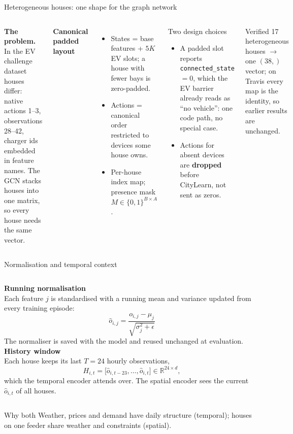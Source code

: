 \documentclass[aspectratio=169,10pt]{beamer}
\newcommand{\R}{\mathbb{R}}
\begin{document}
\begin{frame}{Heterogeneous houses: one shape for the graph network}
\begin{columns}[T]
\textbf{The problem.} In the EV challenge dataset houses differ: native actions 1--3, observations 28--42, charger ids embedded in feature names. The GCN stacks houses into one matrix, so every house needs the same vector.

\vspace{0.4em}
\textbf{Canonical padded layout}
\begin{itemize}
  \item States = base features + $5K$ EV slots; a house with fewer bays is zero-padded.
  \item Actions = canonical order restricted to devices some house owns.
  \item Per-house index map; presence mask $M \in \{0,1\}^{B\times A}$.
\end{itemize}
\begin{block}{Two design choices}
\begin{itemize}
  \item A padded slot reports \texttt{connected\_state} $=0$, which the EV barrier already reads as ``no vehicle'': one code path, no special case.
  \item Actions for absent devices are \textbf{dropped} before CityLearn, not sent as zeros.
\end{itemize}
\end{block}
\begin{exampleblock}{Verified}
17 heterogeneous houses $\rightarrow$ one $(38,)$ vector; on Travis every map is the identity, so earlier results are unchanged.
\end{exampleblock}
\end{columns}
\end{frame}

\begin{frame}{Normalisation and temporal context}
\begin{columns}[T]
\textbf{Running normalisation}\\[2pt]
Each feature $j$ is standardised with a running mean and variance updated from every training episode:
\[
\hat o_{i,j} = \frac{o_{i,j} - \mu_j}{\sqrt{\sigma^2_j + \epsilon}}
\]
The normaliser is saved with the model and reused unchanged at evaluation.
\textbf{History window}\\[2pt]
Each house keeps its last $T = 24$ hourly observations,
\[
H_{i,t} = \big[\hat o_{i,t-23}, \dots, \hat o_{i,t}\big] \in \R^{24 \times d},
\]
which the temporal encoder attends over. The spatial encoder sees the current $\hat o_{i,t}$ of all houses.
\end{columns}
\vspace{0.6em}
\begin{block}{Why both}
Weather, prices and demand have daily structure (temporal); houses on one feeder share weather and constraints (spatial).
\end{block}
\end{frame}
\end{document}
